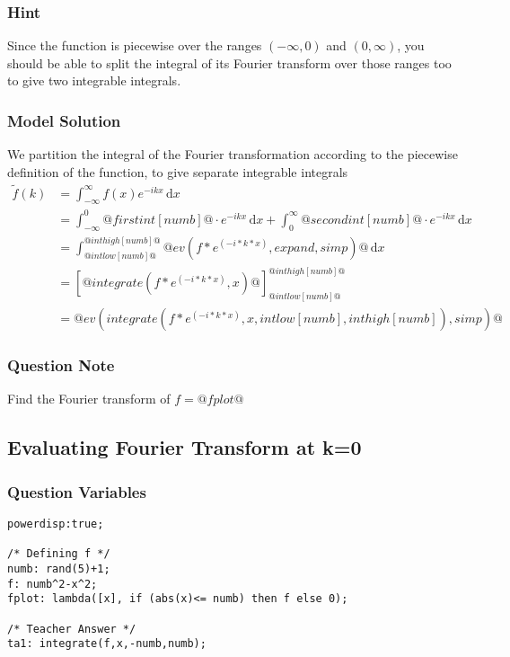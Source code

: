 \documentclass[a4paper,10pt]{article}
\begin{document}
\subsubsection{Hint}
Since the function is piecewise over the ranges \((-\infty,0) \) and \((0,\infty) \), you should be able to split the integral of its Fourier transform over those ranges too to give two integrable integrals.
\subsubsection{Model Solution}
We partition the integral of the Fourier transformation according to the piecewise definition of the function, to give separate integrable integrals \begin{align*} \tilde{f}(k) &= \int_{-\infty}^{\infty} f(x)e^{-ikx} \, \text{d}x \\
&= \int_{-\infty}^{0} @firstint[numb]@ \cdot e^{-ikx} \, \text{d}x + \int_{0}^{\infty} @secondint[numb]@ \cdot e^{-ikx} \, \text{d}x \\
&= \int_{@intlow[numb]@}^{@inthigh[numb]@} @ev(f*e^(-i*k*x),expand,simp)@ \, \text{d}x \\ &= \left[ @integrate(f*e^(-i*k*x),x)@ \right]_{@intlow[numb]@}^{@inthigh[numb]@} \\ &= @ev(integrate(f*e^(-i*k*x),x,intlow[numb],inthigh[numb]),simp)@ \end{align*}
\subsubsection{Question Note}
Find the Fourier transform of  \(f = @fplot@\)

\subsection{Evaluating Fourier Transform at k=0}
\subsubsection{Question Variables}
\begin{lstlisting}
powerdisp:true;

/* Defining f */
numb: rand(5)+1;
f: numb^2-x^2;
fplot: lambda([x], if (abs(x)<= numb) then f else 0);

/* Teacher Answer */
ta1: integrate(f,x,-numb,numb);
\end{lstlisting}
\end{document}
